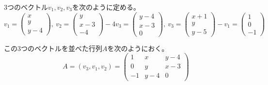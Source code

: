 \documentclass[12pt,b5paper]{ltjsarticle}
\begin{document}
\begin{enumerate}
      3つのベクトル$v_1,v_2,v_3$を次のように定める。
      \begin{equation}
       v_1 = \begin{pmatrix}x\\y\\y-4\end{pmatrix}
      ,\
      v_2 = \begin{pmatrix}y\\x-3\\-4\end{pmatrix} - 4v_3
      = \begin{pmatrix}y-4\\x-3\\0\end{pmatrix}
      ,\
      v_3 = \begin{pmatrix}x+1\\y\\y-5\end{pmatrix} - v_1%
      = \begin{pmatrix}1\\0\\-1\end{pmatrix}
      \end{equation}


      この3つのベクトルを並べた行列$A$を次のようにおく。
      \begin{equation}
       A=(v_3, v_1, v_2)=
       \begin{pmatrix}
        1 & x & y-4 \\
        0 & y & x-3 \\
        -1 & y-4 & 0
       \end{pmatrix}
      \end{equation}


\end{enumerate}
\end{document}

